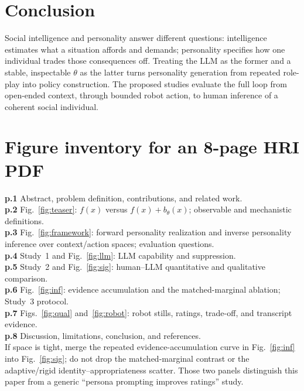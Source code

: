 \documentclass[letterpaper,10pt,conference]{ieeeconf}
\begin{document}
\section{Conclusion}
Social intelligence and personality answer different questions: intelligence estimates what a situation affords and demands; personality specifies how one individual trades those consequences off. Treating the LLM as the former and a stable, inspectable $\theta$ as the latter turns personality generation from repeated role-play into policy construction. The proposed studies evaluate the full loop from open-ended context, through bounded robot action, to human inference of a coherent social individual.

\section*{Figure inventory for an 8-page HRI PDF}
\textbf{p.1} Abstract, problem definition, contributions, and related work.\\
\textbf{p.2} Fig.~\ref{fig:teaser}: $f(x)$ versus $f(x)+b_\theta(x)$; observable and mechanistic definitions.\\
\textbf{p.3} Fig.~\ref{fig:framework}: forward personality realization and inverse personality inference over context/action spaces; evaluation questions.\\
\textbf{p.4} Study~1 and Fig.~\ref{fig:llm}: LLM capability and suppression.\\
\textbf{p.5} Study~2 and Fig.~\ref{fig:sig}: human--LLM quantitative and qualitative comparison.\\
\textbf{p.6} Fig.~\ref{fig:inf}: evidence accumulation and the matched-marginal ablation; Study~3 protocol.\\
\textbf{p.7} Figs.~\ref{fig:qual} and~\ref{fig:robot}: robot stills, ratings, trade-off, and transcript evidence.\\
\textbf{p.8} Discussion, limitations, conclusion, and references.\\
If space is tight, merge the repeated evidence-accumulation curve in Fig.~\ref{fig:inf} into Fig.~\ref{fig:sig}; do not drop the matched-marginal contrast or the adaptive/rigid identity--appropriateness scatter. Those two panels distinguish this paper from a generic ``persona prompting improves ratings'' study.
\end{document}
